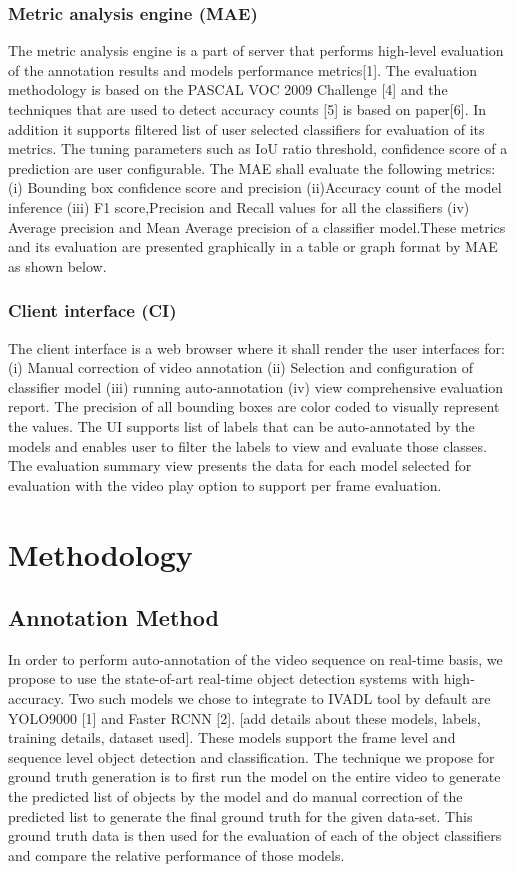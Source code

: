\documentclass[conference]{IEEEtran}
\begin{document}
\subsubsection{Metric analysis engine (MAE)}
The metric analysis engine is a part of server that performs high-level evaluation of the annotation results and models performance metrics[1].  The evaluation methodology is based on the PASCAL VOC 2009 Challenge [4] and the techniques that are used to detect accuracy counts [5] is based on paper[6]. In addition it supports filtered list of user selected classifiers for evaluation of its metrics. The tuning parameters such as IoU ratio threshold, confidence score of a prediction are user configurable. The MAE shall evaluate the following metrics:
(i) Bounding box confidence score and precision (ii)Accuracy count of the model inference (iii) F1 score,Precision and Recall values for all the classifiers (iv) Average precision and Mean Average precision of a classifier model.These metrics and its evaluation are presented graphically in a table or graph format by MAE as shown below. 
\subsubsection{Client interface (CI)}
The client interface is a web browser where it shall render the user interfaces for: (i) Manual correction of video annotation (ii) Selection and configuration of classifier model (iii) running auto-annotation (iv) view comprehensive evaluation report. The precision of all bounding boxes are color coded to visually represent the values. The UI supports list of labels that can be auto-annotated by the models and enables user to filter the labels to view and evaluate those classes. The evaluation summary view presents the data for each model selected for evaluation with the video play option to support per frame evaluation. 


\section{Methodology}
\subsection{Annotation Method} \label{sec.annotation}
In order to perform auto-annotation of the video sequence on real-time basis, we propose to use the state-of-art real-time object detection systems with high-accuracy. 
Two such models we chose to integrate to IVADL tool by default are YOLO9000 [1] and Faster RCNN [2]. [add details about these models, labels, training details, dataset used]. 
These models support the frame level and sequence level object detection and classification. 
The technique we propose for ground truth generation is to first run the model on the entire video to generate the predicted list of objects by the model and do manual correction of the predicted list to generate the final ground truth for the given data-set. 
This ground truth data is then used for the evaluation of each of the object classifiers and compare the relative performance of those models. \par
\end{document}
